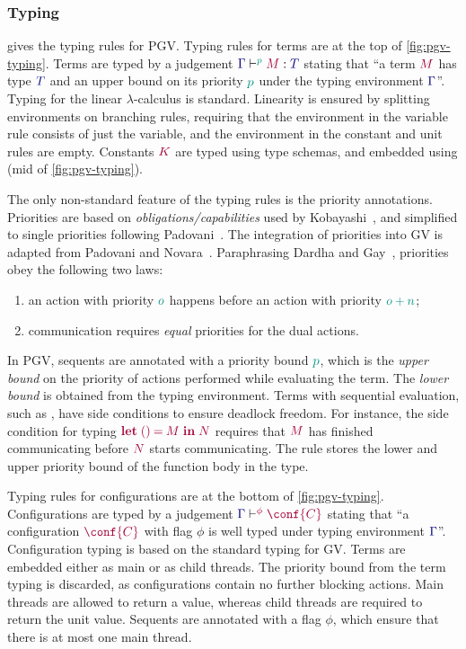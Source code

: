 \documentclass[main.tex]{subfiles}
\begin{document}
\subsubsection*{Typing}
 gives the typing rules for PGV.
Typing rules for terms are at the top of \cref{fig:pgv-typing}. Terms are typed by a judgement $\tseq[\cs{p}]{\ty{\Gamma}}{M}{T}$ stating that ``a term $\tm{M}$ has type $\ty{T}$ and an upper bound on its priority $\cs{p}$ under the typing environment $\ty{\Gamma}$''. Typing for the linear $\lambda$-calculus is standard. Linearity is ensured by splitting environments on branching rules, requiring that the environment in the variable rule consists of just the variable, and the environment in the constant and unit rules are empty. Constants $\tm{K}$ are typed using type schemas, and embedded using  (mid of \cref{fig:pgv-typing}).



The only non-standard feature of the typing rules is the priority annotations. Priorities are based on \emph{obligations/capabilities} used by Kobayashi~\cite{kobayashi06}, and simplified to single priorities following Padovani~\cite{padovani14}. The integration of priorities into GV is adapted from Padovani and Novara~\cite{padovaninovara15}. Paraphrasing Dardha and Gay~\cite{dardhagay18}, priorities obey the following two laws:
\begin{enumerate}
  \item an action with priority $\cs{o}$ happens before an action with priority $\cs{o+n}$;
  \item communication requires \emph{equal} priorities for the dual actions.
\end{enumerate}

In PGV, sequents are annotated with a priority bound $\cs{p}$, which is the \emph{upper bound} on the priority of actions performed while evaluating the term. The \emph{lower bound} is obtained from the typing environment. Terms with sequential evaluation, such as , have side conditions to ensure deadlock freedom. For instance, the side condition for typing $\tm{\letunit{M}{N}}$ requires that $\tm{M}$ has finished communicating before $\tm{N}$ starts communicating. The rule  stores the lower and upper priority bound of the function body in the type.

Typing rules for configurations are at the bottom of \cref{fig:pgv-typing}. Configurations are typed by a judgement $\cseq[\phi]{\ty{\Gamma}}{\conf{C}}$ stating that ``a configuration $\tm{\conf{C}}$ with flag $\phi$ is well typed under typing environment $\ty{\Gamma}$''. Configuration typing is based on the standard typing for GV. Terms are embedded either as main or as child threads. The priority bound from the term typing is discarded, as configurations contain no further blocking actions. Main threads are allowed to return a value, whereas child threads are required to return the unit value. Sequents are annotated with a flag $\phi$, which ensure that there is at most one main thread.
\end{document}

